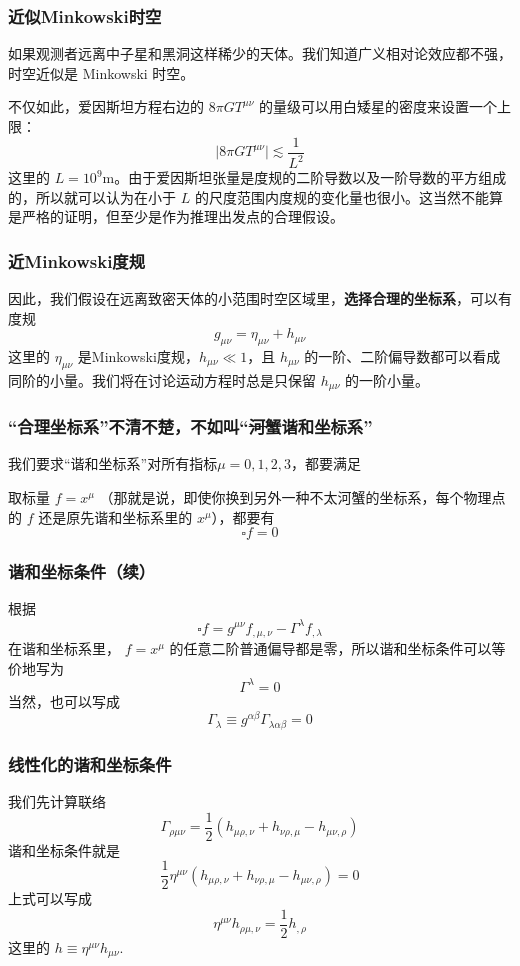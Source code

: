 \documentclass[CJK,13pt]{beamer}
\begin{document}
  
  \begin{frame}
    \frametitle{近似Minkowski时空}
    如果观测者远离中子星和黑洞这样稀少的天体。我们知道广义相对论效应都不强，时空近似是 Minkowski 时空。

    \skipline
    
    不仅如此，爱因斯坦方程右边的 $8\pi G T^{\mu\nu}$ 的量级可以用白矮星的密度来设置一个上限：
    $$\lvert 8\pi G T^{\mu\nu}\rvert \lesssim \frac{1}{L^2}$$
    这里的 $L=10^9\mathrm{m}$。由于爱因斯坦张量是度规的二阶导数以及一阶导数的平方组成的，所以就可以认为在小于 $L$ 的尺度范围内度规的变化量也很小。这当然不能算是严格的证明，但至少是作为推理出发点的合理假设。
  \end{frame}


  \begin{frame}
    \frametitle{近Minkowski度规}
    因此，我们假设在远离致密天体的小范围时空区域里，{\bf 选择合理的坐标系}，可以有度规
    $$ g_{\mu\nu} = \eta_{\mu\nu}+h_{\mu\nu}$$
    这里的 $\eta_{\mu\nu}$ 是Minkowski度规，$h_{\mu\nu}\ll 1$，且 $h_{\mu\nu}$ 的一阶、二阶偏导数都可以看成同阶的小量。我们将在讨论运动方程时总是{\blue 只保留 $h_{\mu\nu}$ 的一阶小量}。
  \end{frame}


  \begin{frame}
    \frametitle{“合理坐标系”不清不楚，不如叫“\sout{河蟹}谐和坐标系”}
    我们要求“谐和坐标系”对所有指标$\mu=0,1,2,3$，都要满足
  
  
    取标量 $f = x^\mu$ （那就是说，即使你换到另外一种不太河蟹的坐标系，每个物理点的 $f$ 还是原先谐和坐标系里的 $x^\mu$），都要有
    $$\square f = 0$$
  \end{frame}

  \begin{frame}
    \frametitle{谐和坐标条件（续）}
    根据
    $$ \square f = g^{\mu\nu}f_{,\mu,\nu} - \Gamma^\lambda f_{,\lambda}$$
    在谐和坐标系里， $f=x^\mu$ 的任意二阶普通偏导都是零，所以谐和坐标条件可以等价地写为
    $$\Gamma^\lambda = 0$$
    当然，也可以写成
    $$\Gamma_\lambda \equiv g^{\alpha\beta}\Gamma_{\lambda\alpha\beta}=0$$
  \end{frame}




  \begin{frame}
    \frametitle{线性化的谐和坐标条件}
    我们先计算联络
    $$\Gamma_{\rho\mu\nu} = \frac{1}{2}\left(h_{\mu\rho,\nu}+h_{\nu\rho,\mu}-h_{\mu\nu,\rho}\right)$$    
    谐和坐标条件就是
    $$\frac{1}{2}\eta^{\mu\nu}\left(h_{\mu\rho,\nu}+h_{\nu\rho,\mu}-h_{\mu\nu,\rho}\right) = 0$$
    上式可以写成
    $$ \eta^{\mu\nu}h_{\rho\mu,\nu} =\frac{1}{2} h_{,\rho} $$
    这里的 $h\equiv \eta^{\mu\nu}h_{\mu\nu}$.
  \end{frame}
\end{document}
